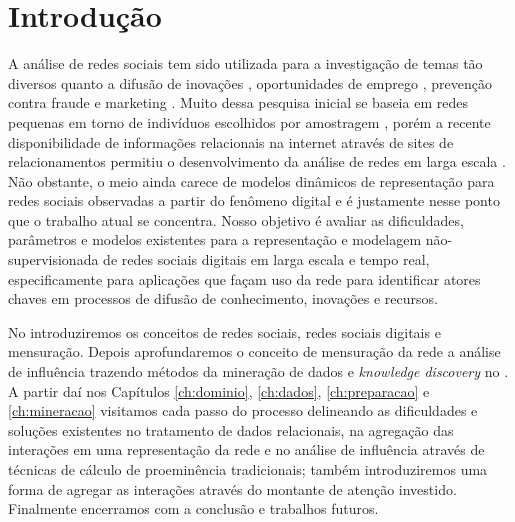 \chapter{Introdução}
\label{ch:introducao}
A análise de redes sociais tem sido utilizada para a investigação
de temas tão diversos quanto a difusão de inovações \citep{Coleman1966},
oportunidades de emprego \citep{Granovetter1995}, prevenção contra fraude
\citep{Neville2005} e marketing \citep{Domingos2001}. Muito dessa pesquisa
inicial se baseia em redes pequenas em torno de indivíduos escolhidos por amostragem
\citep{Wasserman}\citep{Newman2006}, porém a recente disponibilidade de
informações relacionais na internet através de sites de relacionamentos permitiu o
desenvolvimento da análise de redes em larga escala \citep{Boyd2007}. Não
obstante, o meio ainda carece de modelos dinâmicos de representação para redes
sociais observadas a partir do fenômeno digital \citep{Xiang2010} e é justamente
nesse ponto que o trabalho atual se concentra. Nosso objetivo é avaliar as
dificuldades, parâmetros e modelos existentes para a representação e modelagem
não-supervisionada de redes sociais digitais em larga escala e tempo real,
especificamente para aplicações que façam uso da rede para identificar atores
chaves em processos de difusão de conhecimento, inovações e recursos.

No  introduziremos os conceitos de redes sociais, redes sociais
digitais e mensuração. Depois aprofundaremos o conceito de mensuração da rede a
análise de influência trazendo métodos da mineração de dados e \emph{knowledge
discovery} no . A partir daí nos Capítulos \ref{ch:dominio},
\ref{ch:dados}, \ref{ch:preparacao} e \ref{ch:mineracao} visitamos cada passo do
processo delineando as dificuldades e soluções existentes no tratamento de dados
relacionais, na agregação das interações em uma representação da rede e no
análise de influência através de técnicas de cálculo de proeminência
tradicionais; também introduziremos uma forma de agregar as interações através do
montante de atenção investido. Finalmente encerramos com a conclusão e trabalhos
futuros.